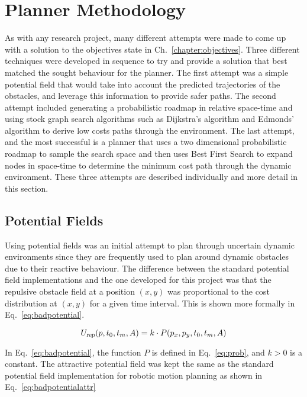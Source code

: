 


\chapter{Planner Methodology}

\label{chapter:plannermethodology}

As with any research project, many different attempts were made to come up with
a solution to the objectives state in Ch.~\ref{chapter:objectives}. Three
different techniques were developed in sequence to try and provide a solution
that best matched the sought behaviour for the planner. The first attempt was a
simple potential field that would take into account the predicted trajectories
of the obstacles, and leverage this information to provide safer paths. The
second attempt included generating a probabilistic roadmap in relative
space-time and using stock graph search algorithms such as Dijkstra's algorithm
and Edmonds' algorithm to derive low costs paths through the environment. The
last attempt, and the most successful is a planner that uses a two dimensional
probabilistic roadmap to sample the search space and then uses Best First
Search to expand nodes in space-time to determine the minimum cost path through
the dynamic environment. These three attempts are described individually and
more detail in this section.

\section{Potential Fields}

Using potential fields was an initial attempt to plan through uncertain dynamic
environments since they are frequently used to plan around dynamic obstacles
due to their reactive behaviour. The difference between the standard potential
field implementations and the one developed for this project was that the
repulsive obstacle field at a position $(x, y)$ was proportional to the cost
distribution at $(x, y)$ for a given time interval. This is shown more formally
in Eq.~\ref{eq:badpotential}.

\begin{equation}
    U_{\Var{rep}}(p, t_0, t_m, A) = k \cdot P(p_x, p_y, t_0, t_m, A)
    \label{eq:badpotential}
\end{equation}

In Eq.~\ref{eq:badpotential}, the function $P$ is defined in Eq.~\ref{eq:prob},
and $k > 0$ is a constant.  The attractive potential field was kept the same as
the standard potential field implementation for robotic motion planning as
shown in Eq.~\ref{eq:badpotentialattr}

